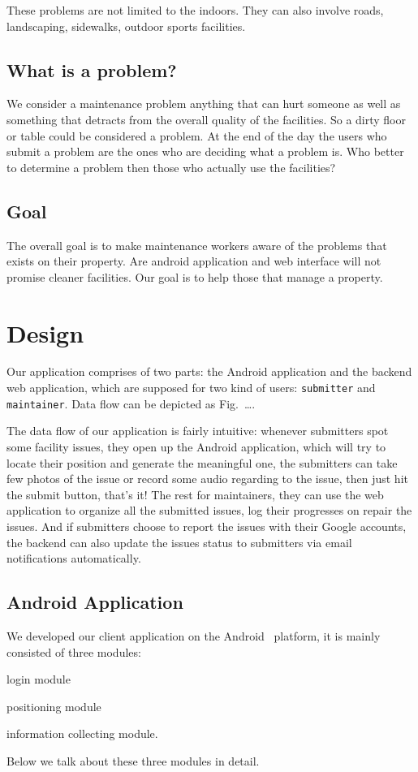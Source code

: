 \documentclass{acm_proc_article-sp}
\begin{document}
These problems are not limited to the indoors. They can also involve roads, landscaping, sidewalks, outdoor sports facilities.

\subsection{What is a problem?}
We consider a maintenance problem anything that can hurt someone as well as something that detracts from the overall quality of the facilities. 
So a dirty floor or table could be considered a problem. 
At the end of the day the users who submit a problem are the ones who are deciding what a problem is. 
Who better to determine a problem then those who actually use the facilities?

\subsection{Goal}
The overall goal is to make maintenance workers aware of the problems that exists on their property. 
Are android application and web interface will not promise cleaner facilities. Our goal is to help those that manage a property.

\section{Design}
Our application comprises of two parts: the Android application and the backend web application, which are supposed for two kind of users:
\texttt{submitter} and \texttt{maintainer}. Data flow can be depicted as Fig.~\ldots.

The data flow of our application is fairly intuitive: whenever submitters spot some facility issues, they open up the Android application, which will
try to locate their position and generate the meaningful one, the submitters can take few photos of the issue or record some audio regarding to
the issue, then just hit the submit button, that's it! The rest for maintainers, they can use the web application to organize all the submitted issues,
log their progresses on repair the issues. And if submitters choose to report the issues with their Google accounts, the backend can also update
the issues status to submitters via email notifications automatically.

\subsection{Android Application}
We developed our client application on the Android~\cite{android} platform,
it is mainly consisted of three modules:
\begin{inparaenum}
 \item login module
 \item positioning module
 \item information collecting module.
 \end{inparaenum}
 Below we talk about these three modules in detail.
\end{document}
